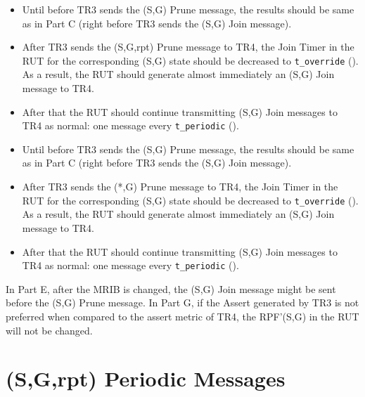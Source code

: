 \documentclass[11pt]{report}
\begin{document}

\begin{itemize}

  \item Until before TR3 sends the (S,G) Prune message, the results should
  be same as in Part C (right before TR3 sends the (S,G) Join message).

  \item After TR3 sends the (S,G,rpt) Prune message to TR4,
  the Join Timer in the RUT for the corresponding (S,G) state
  should be decreased to \verb=t_override= ({\PimsmTOverride}). As a result,
  the RUT should generate almost immediately an (S,G) Join message to TR4.

  \item After that the RUT should continue transmitting 
  (S,G) Join messages to TR4 as normal: one message every \verb=t_periodic=
  ({\PimsmTPeriodic}).

\end{itemize}


\begin{itemize}

  \item Until before TR3 sends the (S,G) Prune message, the results should
  be same as in Part C (right before TR3 sends the (S,G) Join message).

  \item After TR3 sends the (*,G) Prune message to TR4,
  the Join Timer in the RUT for the corresponding (S,G) state
  should be decreased to \verb=t_override= ({\PimsmTOverride}). As a result,
  the RUT should generate almost immediately an (S,G) Join message to TR4.

  \item After that the RUT should continue transmitting 
  (S,G) Join messages to TR4 as normal: one message every \verb=t_periodic=
  ({\PimsmTPeriodic}).

\end{itemize}


In Part E, after the MRIB is changed, the (S,G) Join message might
be sent before the (S,G) Prune message. In Part G, if the Assert generated by
TR3 is not preferred when compared to the assert metric of TR4, the RPF'(S,G)
in the RUT will not be changed.

\newpage
\section{(S,G,rpt) Periodic Messages}
\end{document}
